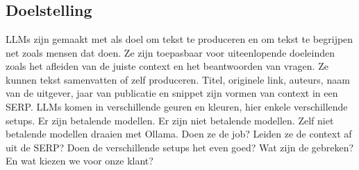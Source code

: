 
\chapter{}%
\label{ch:ner}

\section{Doelstelling}
LLMs zijn gemaakt met als doel om tekst te produceren en om tekst te begrijpen net zoals mensen dat doen. Ze zijn toepasbaar voor uiteenlopende doeleinden zoals het afleiden van de juiste context en het beantwoorden van vragen. Ze kunnen tekst samenvatten of zelf produceren.
Titel, originele link, auteurs, naam van de uitgever, jaar van publicatie en snippet zijn vormen van context in een SERP.
LLMs komen in verschillende geuren en kleuren, hier enkele verschillende setups.
Er zijn betalende modellen.
Er zijn niet betalende modellen.
Zelf niet betalende modellen draaien met Ollama.
Doen ze de job? Leiden ze de context af uit de SERP? Doen de verschillende setups het even goed? Wat zijn de gebreken? En wat kiezen we voor onze klant?

